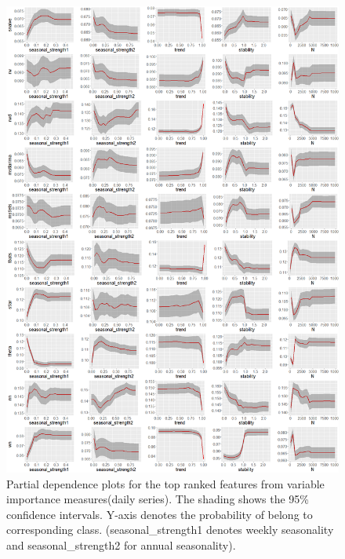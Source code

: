 \documentclass[11pt,a4paper,]{article}
\begin{document}
\newpage

\begin{figure}
\centering
\includegraphics{figures/dailypdp-1.png}
\caption{\label{fig:dailypdp}Partial dependence plots for the top ranked
features from variable importance measures(daily series). The shading
shows the 95\% confidence intervals. Y-axis denotes the probability of
belong to corresponding class. (seasonal\_strength1 denotes weekly
seasonality and seasonal\_strength2 for annual seasonality).}
\end{figure}

\newpage
\end{document}

